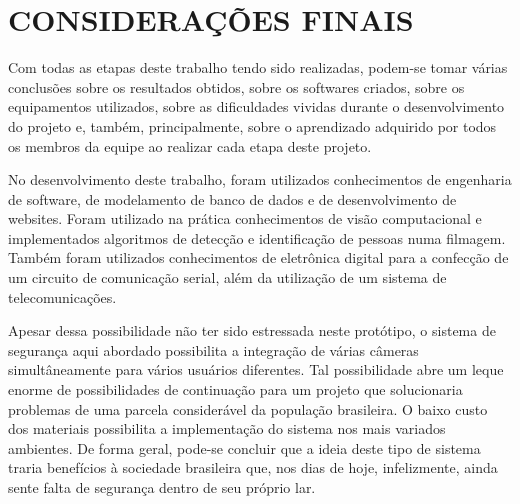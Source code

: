 \chapter{CONSIDERAÇÕES FINAIS}
\label{chap:consideracoesFinais}

Com todas as etapas deste trabalho tendo sido realizadas, podem-se tomar várias conclusões sobre os resultados obtidos, sobre os softwares criados, sobre os equipamentos utilizados, sobre as dificuldades vividas durante o desenvolvimento do projeto e, também, principalmente, sobre o aprendizado adquirido por todos os membros da equipe ao realizar cada etapa deste projeto.

No desenvolvimento deste trabalho, foram utilizados conhecimentos de engenharia de software, de modelamento de banco de dados e de desenvolvimento de websites. Foram utilizado na prática conhecimentos de visão computacional e implementados algoritmos de detecção e identificação de pessoas numa filmagem. Também foram utilizados conhecimentos de eletrônica digital para a confecção de um circuito de comunicação serial, além da utilização de um sistema de telecomunicações. 

Apesar dessa possibilidade não ter sido estressada neste protótipo, o sistema de segurança aqui abordado possibilita a integração de várias câmeras simultâneamente para vários usuários diferentes. Tal possibilidade abre um leque enorme de possibilidades de continuação para um projeto que solucionaria problemas de uma parcela considerável da população brasileira. O baixo custo dos materiais possibilita a implementação do sistema nos mais variados ambientes. De forma geral, pode-se concluir que a ideia deste tipo de sistema traria benefícios à sociedade brasileira que, nos dias de hoje, infelizmente, ainda sente falta de segurança dentro de seu próprio lar.